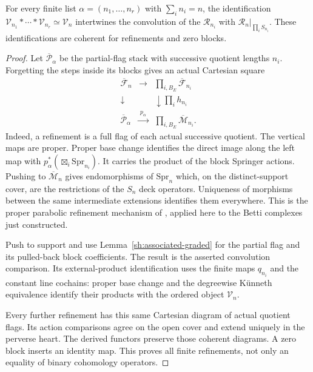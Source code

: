 \begin{proposition}\label{sh:block-action}
For every finite list $\alpha=(n_1,\ldots,n_r)$ with
$\sum_i n_i=n$, the identification
$\mathcal V_{n_1}*\cdots*\mathcal V_{n_r}\simeq\mathcal V_n$
intertwines the convolution of the $\mathcal R_{n_i}$ with
$\mathcal R_n|_{\prod_iS_{n_i}}$. These identifications are
coherent for refinements and zero blocks.
\end{proposition}
\begin{proof}
Let $\overline{\mathcal P}_\alpha$ be the partial-flag stack
with successive quotient lengths $n_i$. Forgetting the steps
inside its blocks gives an actual Cartesian square
\[
 \begin{array}{ccc}
 \overline{\mathcal F}_n&\longrightarrow&
             \displaystyle\prod_{i,B_E}\overline{\mathcal F}_{n_i}\\
 \downarrow&&\downarrow\prod_i h_{n_i}\\
 \overline{\mathcal P}_\alpha&\xrightarrow{\ p_\alpha\ }&
             \displaystyle\prod_{i,B_E}\overline{\mathcal M}_{n_i}.
 \end{array}
\]
Indeed, a refinement is a full flag of each actual successive
quotient. The vertical maps are proper. Proper base change
identifies the direct image along the left map with
$p_\alpha^*(\boxtimes_i\mathrm{Spr}_{n_i})$.
It carries the product of the block Springer actions. Pushing
to $\overline{\mathcal M}_n$ gives endomorphisms of
$\mathrm{Spr}_n$ which, on the distinct-support cover, are the
restrictions of the $S_n$ deck operators. Uniqueness of morphisms
between the same intermediate extensions identifies them
everywhere. This is the proper parabolic refinement mechanism
of \cite[proof of Corollary~3.7]{FengYunZhang2024}, applied here
to the Betti complexes just constructed.

Push to support and use Lemma~\ref{sh:associated-graded} for the
partial flag and its pulled-back block coefficients. The result
is the asserted convolution comparison. Its external-product
identification uses the finite maps $q_{n_i}$ and the constant
line cochains: proper base change and the degreewise K\"unneth
equivalence identify their products with the ordered object
$\mathcal V_n$.

Every further refinement has this same Cartesian diagram of
actual quotient flags. Its action comparisons agree on the
open cover and extend uniquely in the perverse heart. The
derived functors preserve those coherent diagrams. A zero block
inserts an identity map. This proves all finite refinements,
not only an equality of binary cohomology operators.
\end{proof}

